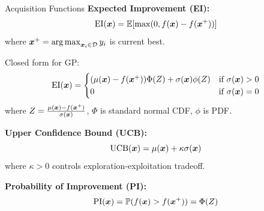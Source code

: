 \documentclass[aspectratio=169]{beamer}
\begin{document}
\begin{frame}{Acquisition Functions}
  \textbf{Expected Improvement (EI):}
  $$\text{EI}(\boldsymbol{x}) = \mathbb{E}[\max(0, f(\boldsymbol{x}) - f(\boldsymbol{x}^+))]$$
  where $\boldsymbol{x}^+ = \operatorname*{arg\,max}_{\boldsymbol{x}_i \in \mathcal{D}} y_i$ is current best.

  Closed form for GP:
  $$\text{EI}(\boldsymbol{x}) = \begin{cases}
    (\mu(\boldsymbol{x}) - f(\boldsymbol{x}^+))\Phi(Z) + \sigma(\boldsymbol{x})\phi(Z) & \text{if } \sigma(\boldsymbol{x}) > 0 \\
    0 & \text{if } \sigma(\boldsymbol{x}) = 0
  \end{cases}$$
  where $Z = \frac{\mu(\boldsymbol{x}) - f(\boldsymbol{x}^+)}{\sigma(\boldsymbol{x})}$, $\Phi$ is standard normal CDF, $\phi$ is PDF.

  \vspace{0.5em}

  \textbf{Upper Confidence Bound (UCB):}
  $$\text{UCB}(\boldsymbol{x}) = \mu(\boldsymbol{x}) + \kappa \sigma(\boldsymbol{x})$$
  where $\kappa > 0$ controls exploration-exploitation tradeoff.

  \vspace{0.5em}

  \textbf{Probability of Improvement (PI):}
  $$\text{PI}(\boldsymbol{x}) = \mathbb{P}(f(\boldsymbol{x}) > f(\boldsymbol{x}^+)) = \Phi(Z)$$
\end{frame}
\end{document}
